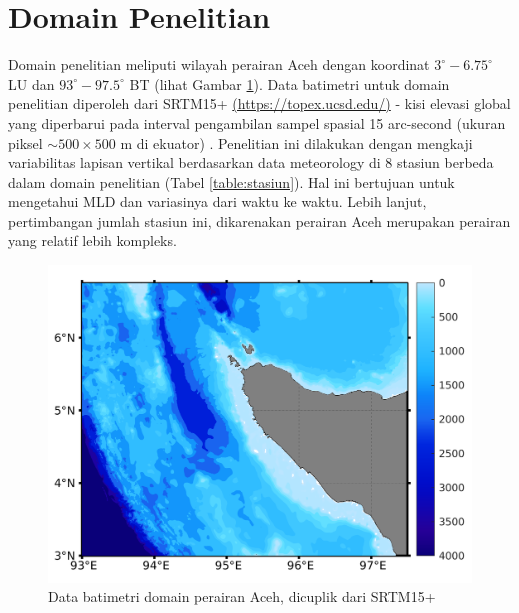 \vspace{1.5pc}
\section[Domain Penelitian]{Domain Penelitian}
\begin{spacing}{1.5}
	Domain penelitian meliputi wilayah perairan Aceh dengan koordinat $3^\circ-6.75^\circ$ LU dan $93^\circ-97.5^\circ$ BT (lihat Gambar \ref{fig:domain}). Data batimetri untuk domain penelitian diperoleh dari SRTM15+ \href{https://topex.ucsd.edu/pub/archive/srtm15/V1/}{(https://topex.ucsd.edu/)} - kisi elevasi global yang diperbarui pada interval pengambilan sampel spasial 15 arc-second (ukuran piksel $\sim 500 \times 500$ m di ekuator) . Penelitian ini dilakukan dengan mengkaji variabilitas lapisan vertikal berdasarkan data meteorology di 8 stasiun berbeda dalam domain penelitian (Tabel \ref{table:stasiun}). Hal ini bertujuan untuk mengetahui MLD dan variasinya dari waktu ke waktu. Lebih lanjut, pertimbangan jumlah stasiun ini, dikarenakan perairan Aceh merupakan perairan yang relatif lebih kompleks. 
	\begin{figure}[H]
		\centering
		\includegraphics[width=15cm]{contents/bathymetri}
		\caption{Data batimetri domain perairan Aceh, dicuplik dari SRTM15+}
		\label{fig:domain}
	\end{figure}
	

\end{spacing}
